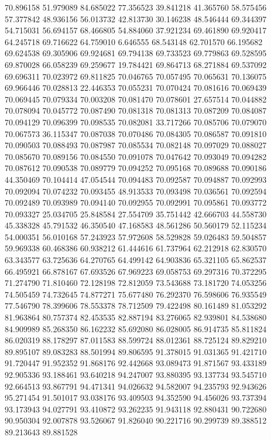 70.896158
51.979089
84.685022
77.356523
39.841218
41.365760
58.575456
57.377842
48.936156
56.013732
42.813730
30.146238
48.546444
69.344397
54.715031
56.694157
68.466805
54.884060
37.921234
69.461890
69.920417
64.245718
69.716622
64.759010
6.646555
68.543148
62.701570
66.195682
69.624538
69.305906
69.924681
69.794138
69.733523
69.779863
69.528595
69.870028
66.058239
69.259677
19.784421
69.864713
68.271884
69.537092
69.696311
70.023972
69.811825
70.046765
70.057495
70.065631
70.136075
69.966446
70.028813
22.446353
70.055231
70.070424
70.081616
70.069439
70.069445
70.079334
70.003208
70.081470
70.078601
27.657514
70.044882
70.078094
70.045772
70.087490
70.081318
70.081313
70.087209
70.084087
70.094129
70.096399
70.098535
70.082081
33.717266
70.085706
70.079070
70.067573
36.115347
70.087038
70.070486
70.084305
70.086587
70.091810
70.090503
70.088493
70.087987
70.085534
70.082148
70.097029
70.088027
70.085670
70.089156
70.084550
70.091078
70.047642
70.093049
70.094282
70.087612
70.090538
70.089779
70.094252
70.095168
70.089688
70.090186
44.350469
70.104414
47.054544
70.094483
70.092587
70.094887
70.092993
70.092094
70.074232
70.093455
48.913533
70.093498
70.036561
70.092594
70.092489
70.093989
70.094140
70.092955
70.092991
70.095861
70.093772
70.093327
25.034705
25.848584
27.554709
35.751442
42.666703
44.558730
45.338328
45.791532
46.350540
47.168583
48.561286
50.560179
52.115234
54.000351
56.010168
57.243923
57.972608
58.529828
59.026483
59.504857
59.969338
60.468386
60.938212
61.444616
61.737964
62.212918
62.830570
63.343577
63.725636
64.270765
64.499142
64.903836
65.321105
65.862537
66.495921
66.878167
67.693526
67.969223
69.058753
69.297316
70.372295
71.274790
71.810460
72.128198
72.812059
73.543688
73.181720
74.053256
74.505459
74.732645
74.877271
75.677480
76.292370
76.598606
76.935549
77.546790
78.399606
78.553378
78.712509
79.422498
80.161489
81.053292
81.963864
80.757374
82.453535
82.887194
83.276065
82.939801
84.538680
84.909989
85.268350
86.162232
85.692080
86.028005
86.914735
85.811824
86.020319
88.178297
87.011583
88.599724
88.012361
88.725124
89.829210
89.895107
89.083283
88.501994
89.806595
91.378015
91.031365
91.421710
91.720447
91.952352
91.868176
92.442668
93.089473
91.871567
93.433189
92.905336
93.188461
93.640218
94.247007
93.880395
93.137734
93.545710
92.664513
93.867791
94.471341
94.026632
94.582007
94.235793
92.943626
95.271454
91.501017
93.038176
93.409503
94.352590
94.456026
93.737394
93.173943
94.027791
93.410872
93.262235
91.943118
92.880431
90.722680
90.950304
92.007878
93.526067
91.826040
90.221716
90.299739
89.388512
89.213643
89.881528
